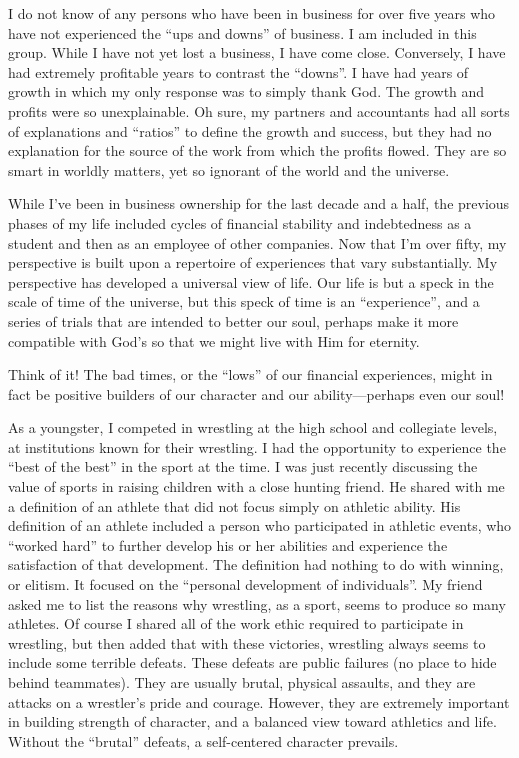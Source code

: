 \documentclass[12pt]{memoir}
\begin{document}
I do not know of any persons who have been in business for over five
years who have not experienced the ``ups and downs'' of business.
I am included in this group. While I have not yet lost a business,
I have come close. Conversely, I have had extremely profitable years
to contrast the ``downs''. I have had years of growth in which my
only response was to simply thank God. The growth and profits were
so unexplainable. Oh sure, my partners and accountants had all sorts
of explanations and ``ratios'' to define the growth and success,
but they had no explanation for the source of the work from which
the profits flowed. They are so smart in worldly matters, yet so ignorant
of the world and the universe.

While I've been in business ownership for the last decade and a half,
the previous phases of my life included cycles of financial stability
and indebtedness as a student and then as an employee of other companies.
Now that I'm over fifty, my perspective is built upon a repertoire
of experiences that vary substantially. My perspective has developed
a universal view of life. Our life is but a speck in the scale of
time of the universe, but this speck of time is an ``experience'',
and a series of trials that are intended to better our soul, perhaps
make it more compatible with God's so that we might live with Him
for eternity. 

Think of it! The bad times, or the ``lows'' of our financial experiences,
might in fact be positive builders of our character and our ability---perhaps
even our soul!

As a youngster, I competed in wrestling at the high school and collegiate
levels, at institutions known for their wrestling. I had the opportunity
to experience the ``best of the best'' in the sport at the time.
I was just recently discussing the value of sports in raising children
with a close hunting friend. He shared with me a definition of an
athlete that did not focus simply on athletic ability. His definition
of an athlete included a person who participated in athletic events,
who ``worked hard'' to further develop his or her abilities and
experience the satisfaction of that development. The definition had
nothing to do with winning, or elitism. It focused on the ``personal
development of individuals''. My friend asked me to list the reasons
why wrestling, as a sport, seems to produce so many athletes. Of course
I shared all of the work ethic required to participate in wrestling,
but then added that with these victories, wrestling always seems to
include some terrible defeats. These defeats are public failures (no
place to hide behind teammates). They are usually brutal, physical
assaults, and they are attacks on a wrestler's pride and courage.
However, they are extremely important in building strength of character,
and a balanced view toward athletics and life. Without the ``brutal''
defeats, a self-centered character prevails.
\end{document}
